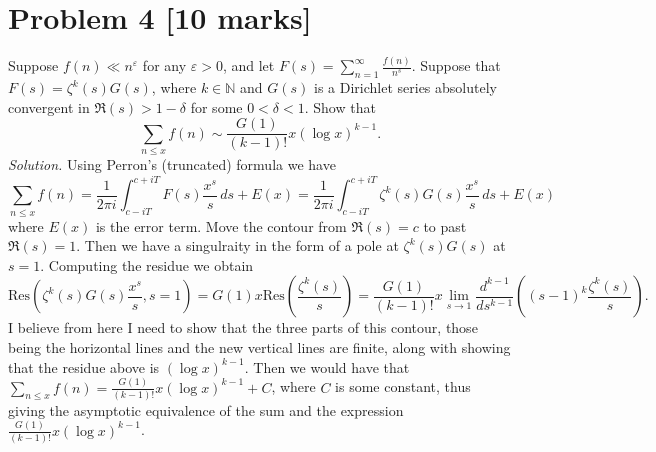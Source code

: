 \documentclass[12pt]{article}
\begin{document}
\section*{Problem 4 [10 marks]} 
Suppose $f(n)\ll n^{\varepsilon}$ for any $\varepsilon>0$, and let $F(s)=\sum_{n=1}^{\infty}\frac{f(n)}{n^s}$. Suppose that $F(s)=\zeta^k(s)G(s)$, where $k\in\mathbb{N}$ and $G(s)$ is a Dirichlet series absolutely convergent in $\Re(s)>1-\delta$ for some $0<\delta<1$. Show that 
\[
    \sum_{n\leq x}f(n)\sim\frac{G(1)}{(k-1)!}x(\log x)^{k-1}.
\]
\textit{Solution.} Using Perron's (truncated) formula we have
\[
    \sum_{n\leq x}f(n)=\frac{1}{2\pi i}\int_{c-iT}^{c+iT}F(s)\frac{x^s}{s}\,ds+E(x)=\frac{1}{2\pi i}\int_{c-iT}^{c+iT}\zeta^k(s)G(s)\frac{x^s}{s}\,ds+E(x)
\]
where $E(x)$ is the error term. Move the contour from $\Re(s)=c$ to past $\Re(s)=1$. Then we have a singulraity in the form of a pole at $\zeta^k(s)G(s)$ at $s=1$. Computing the residue we obtain 
\[
    \mathrm{Res}\left(\zeta^k(s)G(s)\frac{x^s}{s},s=1\right)=G(1)x\mathrm{Res}\left(\frac{\zeta^k(s)}{s}\right)=\frac{G(1)}{(k-1)!}x\lim_{s\to1}\frac{d^{k-1}}{ds^{k-1}}\left((s-1)^k\frac{\zeta^k(s)}{s}\right).
\] 
I believe from here I need to show that the three parts of this contour, those being the horizontal lines and the new vertical lines are finite, along with showing that the residue above is $(\log x)^{k-1}$. Then we would have that $\sum_{n\leq x}f(n)=\frac{G(1)}{(k-1)!}x(\log x)^{k-1}+C$, where $C$ is some constant, thus giving the asymptotic equivalence of the sum and the expression $\frac{G(1)}{(k-1)!}x(\log x)^{k-1}$.
\end{document}
